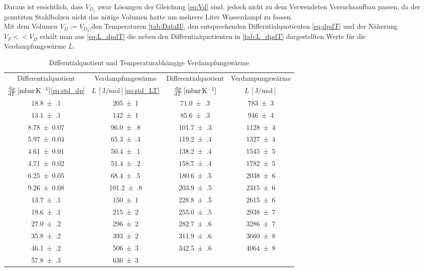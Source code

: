 	Daraus ist ersichtlich, dass $V_{D_{1}}$ zwar Lösungen der Gleichung \eqref{eq:Vd} sind, jedoch nicht zu dem Verwendeten Versuchsaufbau
	passen, da der genutzten Stahlbolzen nicht das nötige Volumen hatte um mehrere Liter Wasserdampf zu fassen.\\
	Mit dem Volumen $V_{D} := V_{D_{2}}$,den Temperaturen \autoref{tab:DataII}, den entsprechenden Differntialquotienten \eqref{eq:dpdT} und der Näherung $V_{F} << V_{D}$ erhält man 
	aus \eqref{eq:L_dpdT} die neben den Differntialquotienten in \autoref{tab:L_dpdT} dargestellten Werte für die Verdampfungswärme $L$.
	
	\begin{table}
		\centering
		\begin{tabular}{|c|c||c|c|}
			\hline
			Differentialquotient & Verdampfungswärme & Differentialquotient & Verdampungswärme\\
			$\od{p}{T}\,[\si[prefixes-as-symbols = true]{\milli\bar\per\kelvin}]$\eqref{eq:std_dp} & 
			$L\,[\si{\joule\per\mole}]$\eqref{eq:std_LT} & $\od{p}{T}\,[\si[prefixes-as-symbols = true]{\milli\bar\per\kelvin}]$ & 
			$L\,[\si{\joule\per\mole}]$\\ \hline\hline
				\num{18.8(1)}  & \num{205(1)} & \num{71.0(3)}  & \num{783(3)} \\
				\num{13.1(1)}  & \num{142(1)} & \num{85.6(3)}  & \num{946(4)} \\
				\num{8.78(7)}  & \num{96.0(8)} &\num{101.7(3)}  & \num{1128(4)} \\
				\num{5.97(4)}  & \num{65.3(4)} &\num{119.2(4)}  & \num{1327(4)} \\
				\num{4.61(1)}  & \num{50.4(1)} &\num{138.2(4)}  & \num{1545(5)} \\
				\num{4.71(2)}  & \num{51.4(2)} &\num{158.7(4)}  & \num{1782(5)} \\
				\num{6.25(5)}  & \num{68.4(5)} &\num{180.6(5)}  & \num{2038(6)} \\
				\num{9.26(8)}  & \num{101.2(8)} &\num{203.9(5)}  & \num{2315(6)} \\
				\num{13.7(1)}  & \num{150(1)} &\num{228.8(5)}  & \num{2615(6)} \\
				\num{19.6(1)}  & \num{215(2)} &\num{255.0(5)}  & \num{2938(7)} \\
				\num{27.0(2)}  & \num{296(2)} &\num{282.7(6)}  & \num{3286(7)} \\
				\num{35.8(2)}  & \num{393(2)} &\num{311.9(6)}  & \num{3660(8)} \\
				\num{46.1(2)}  & \num{506(3)} &\num{342.5(6)}  & \num{4064(8)} \\
				\num{57.8(3)}  & \num{636(3)} & & \\
			\hline
		\end{tabular}
		\caption{Differntialquotient und Temperaturabhängige Verdampfungswärme \label{tab:L_dpdT}}
	\end{table}
	
